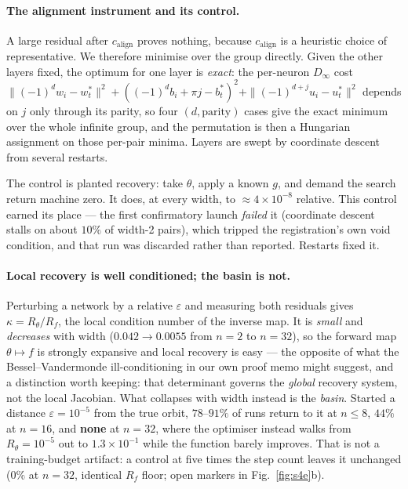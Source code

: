 \documentclass[10pt,twocolumn,letterpaper]{article}
\theoremstyle{definition}
\newcommand{\Dinf}{D_\infty}
\newcommand{\calign}{c_{\mathrm{align}}}
\begin{document}
\paragraph{The alignment instrument and its control.} A large residual after
$\calign$ proves nothing, because $\calign$ is a heuristic choice of representative. We therefore
minimise over the group directly. Given the other layers fixed, the optimum for one layer is
\emph{exact}: the per-neuron $\Dinf$ cost
$\|(-1)^dw_i - w^*_t\|^2 + ((-1)^db_i + \pi j - b^*_t)^2 + \|(-1)^{d+j}u_i - u^*_t\|^2$
depends on $j$ only through its parity, so four $(d,\text{parity})$ cases give the exact minimum
over the whole infinite group, and the permutation is then a Hungarian assignment on those
per-pair minima. Layers are swept by coordinate descent from several restarts.

The control is planted recovery: take $\theta$, apply a known $g$, and demand the search return
machine zero. It does, at every width, to $\approx4\times10^{-8}$ relative. This control earned its
place --- the first confirmatory launch \emph{failed} it (coordinate descent stalls on about
$10\%$ of width-2 pairs), which tripped the registration's own void condition, and that run was
discarded rather than reported. Restarts fixed it.



\paragraph{Local recovery is well conditioned; the basin is not.} Perturbing a network by a
relative $\varepsilon$ and measuring both residuals gives $\kappa = R_\theta/R_f$, the local
condition number of the inverse map. It is \emph{small} and \emph{decreases} with width
($0.042 \to 0.0055$ from $n=2$ to $n=32$), so the forward map $\theta\mapsto f$ is strongly
expansive and local recovery is easy --- the opposite of what the Bessel--Vandermonde
ill-conditioning in our own proof memo might suggest, and a distinction worth keeping: that
determinant governs the \emph{global} recovery system, not the local Jacobian. What collapses with
width instead is the \emph{basin}. Started a distance $\varepsilon=10^{-5}$ from the true orbit,
$78$--$91\%$ of runs return to it at $n\le8$, $44\%$ at $n=16$, and \textbf{none} at $n=32$, where
the optimiser instead walks from $R_\theta = 10^{-5}$ out to $1.3\times10^{-1}$ while the function
barely improves. That is not a training-budget artifact: a control at five times the step count
leaves it unchanged ($0\%$ at $n=32$, identical $R_f$ floor; open markers in
Fig.~\ref{fig:s4e}b).
\end{document}
